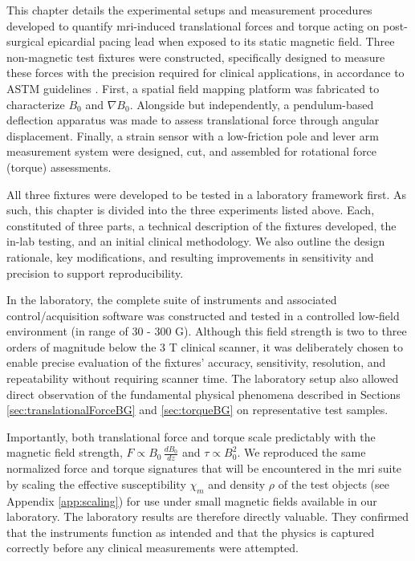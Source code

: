 This chapter details the experimental setups and measurement procedures developed to quantify \gls{mri}-induced translational forces and torque acting on post-surgical epicardial pacing lead when exposed to its static magnetic field. Three non-magnetic test fixtures were constructed, specifically designed to measure these forces with the precision required for clinical applications, in accordance to ASTM guidelines \cite{astmF2052,astm2213,astmF2182,ASTM_F2503_2023}. First, a spatial field mapping platform was fabricated to characterize $B_0$ and $\nabla B_0$. Alongside but independently, a pendulum-based deflection apparatus was made to assess translational force through angular displacement. Finally, a strain sensor with a low-friction pole and lever arm measurement system were designed, cut, and assembled for rotational force (torque) assessments. 

All three fixtures were developed to be tested in a laboratory framework first. As such, this chapter is divided into the three experiments listed above. Each, constituted of three parts, a technical description of the fixtures developed, the in-lab testing, and an initial clinical methodology. We also outline the design rationale, key modifications, and resulting improvements in sensitivity and precision to support reproducibility.

In the laboratory, the complete suite of instruments and associated control/acquisition software was constructed and tested in a controlled low-field environment (in range of 30 - 300 G). Although this field strength is two to three orders of magnitude below the 3 T clinical scanner, it was deliberately chosen to enable precise evaluation of the fixtures’ accuracy, sensitivity, resolution, and repeatability without requiring scanner time. The laboratory setup also allowed direct observation of the fundamental physical phenomena described in Sections \ref{sec:translationalForceBG} and \ref{sec:torqueBG} on representative test samples.

Importantly, both translational force and torque scale predictably with the magnetic field strength, $F \propto B_0 \, \frac{dB_0}{dz}$ and $\tau \propto B_0^2$. We reproduced the same normalized force and torque signatures that will be encountered in the \gls{mri} suite by scaling the effective susceptibility $  \chi_m  $ and density $  \rho  $ of the test objects (see Appendix \ref{app:scaling}) for use under small magnetic fields available in our laboratory. The laboratory results are therefore directly valuable. They confirmed that the instruments function as intended and that the physics is captured correctly before any clinical measurements were attempted.

